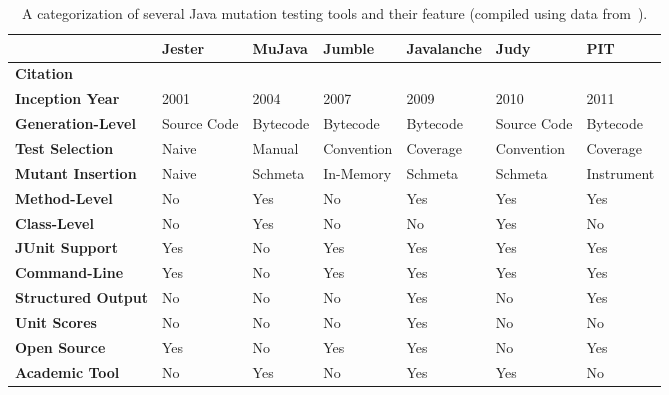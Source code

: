 \begin{table}
  \centering
  \caption{A categorization of several Java mutation testing tools and their feature (compiled using data from~\cite{PIT, MR10}).}
  \label{tab:mutation_tools}
  \begin{threeparttable}
    \begin{tabular}{|l|l|l|l|l|l|l|}
      \rowcolor[RGB]{169,196,223}
      \hline & \textbf{Jester} & \textbf{MuJava} & \textbf{Jumble} & \textbf{Javalanche} & \textbf{Judy} & \textbf{PIT} \\
      \hline \cellcolor[RGB]{169,196,223} \textbf{Citation} & \cite{Jester} & \cite{MOK05} & \cite{Jumble} & \cite{SZ09} & \cite{MR10} & \cite{PIT} \\
      \hline \cellcolor[RGB]{169,196,223} \textbf{Inception Year} & 2001 & 2004 & 2007 & 2009 & 2010 & 2011 \\
      \hline \cellcolor[RGB]{169,196,223} \textbf{Generation-Level} & Source Code & Bytecode & Bytecode & Bytecode & Source Code & Bytecode \\
      \hline \cellcolor[RGB]{169,196,223} \textbf{Test Selection} & Naive\tnote{f} & Manual & Convention & Coverage & Convention & Coverage \\
      \hline \cellcolor[RGB]{169,196,223} \textbf{Mutant Insertion} & Naive\tnote{f} & Schmeta & In-Memory & Schmeta & Schmeta\tnote{c} & Instrument \\
      \hline \cellcolor[RGB]{169,196,223} \textbf{Method-Level} & No & Yes & No & Yes & Yes & Yes \\
      \hline \cellcolor[RGB]{169,196,223} \textbf{Class-Level} & No & Yes & No & No & Yes\tnote{b} & No \\
      \hline \cellcolor[RGB]{169,196,223} \textbf{JUnit Support} & Yes & No\tnote{c} & Yes & Yes & Yes & Yes \\
      \hline \cellcolor[RGB]{169,196,223} \textbf{Command-Line} & Yes & No & Yes & Yes & Yes & Yes \\
      \hline \cellcolor[RGB]{169,196,223} \textbf{Structured Output} & No & No & No & Yes & No & Yes \\
      \hline \cellcolor[RGB]{169,196,223} \textbf{Unit Scores} & No & No & No & Yes & No & No\tnote{g} \\
      \hline \cellcolor[RGB]{169,196,223} \textbf{Open Source} & Yes & No\tnote{d} & Yes & Yes & No & Yes \\
      \hline \cellcolor[RGB]{169,196,223} \textbf{Academic Tool} & No & Yes & No & Yes & Yes & No \\

\end{tabular}
\end{threeparttable}
\end{table}
